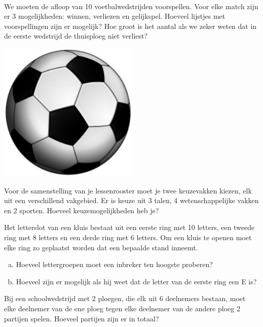 \documentclass[12pt,a4,twoside]{article}
\begin{document}
\begin{oefening}\\
\begin{minipage}[]{0.7\textwidth}
We moeten de afloop van 10 voetbalwedstrijden voorspellen. Voor elke match zijn er 3 mogelijkheden: winnen, verliezen en gelijkspel. Hoeveel lijstjes met voorspellingen zijn er mogelijk? Hoe groot is het aantal als we zeker weten dat in de eerste wedstrijd de thuisploeg niet verliest?
\end{minipage}
\begin{minipage}[]{0.29\textwidth}
  \centering
  \includegraphics[width=0.5\textwidth]{voetbal}
\end{minipage}
\end{oefening}

\begin{oefening}
Voor de samenstelling van je lessenrooster moet je twee keuzevakken kiezen, elk uit een verschillend vakgebied. Er is keuze uit 3 talen, 4 wetenschappelijke vakken en 2 sporten. Hoeveel keuzemogelijkheden heb je?
\end{oefening}

\begin{oefening}
Het letterslot van een kluis bestaat uit een eerste ring met 10 letters, een tweede ring met 8 letters en een derde ring met 6 letters. Om een kluis te openen moet elke ring zo geplaatst worden dat een bepaalde stand inneemt.
\begin{enumerate}[(a)]
  \item Hoeveel lettergroepen moet een inbreker ten hoogste proberen?
  \item Hoeveel zijn er mogelijk als hij weet dat de letter van de eerste ring een E is?
\end{enumerate}
\end{oefening}

\begin{oefening}
Bij een schoolwedstrijd met 2 ploegen, die elk uit 6 deelnemers bestaan, moet elke deelnemer van de ene ploeg tegen elke deelnemer van de andere ploeg 2 partijen spelen. Hoeveel partijen zijn er in totaal?
\end{oefening}
\end{document}
